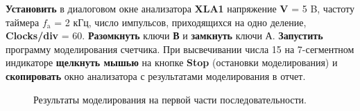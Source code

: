 \documentclass[spec, och, otchet, hidelinks]{SCWorks}
\begin{document}
\textbf{Установить} в диалоговом окне анализатора \textbf{XLA1} напряжение \textbf{V} = 5 B, частоту таймера $ f_\text{a} $ = 2 кГц, число импульсов, 
приходящихся на одно деление, \textbf{Clocks/div} = 60. \textbf{Разомкнуть} ключи \textbf{В} и \textbf{замкнуть} ключи А. \textbf{Запустить} программу 
моделирования счетчика. При высвечивании числа 15 на 7-сегментном индикаторе \textbf{щелкнуть мышью} на кнопке \textbf{Stop} (остановки моделирования) и 
\textbf{скопировать} окно анализатора с результатами моделирования в отчет.

\newpage

\begin{figure}[h]
	\caption{Результаты моделирования на первой части последовательности.}
\end{figure}
\end{document}
